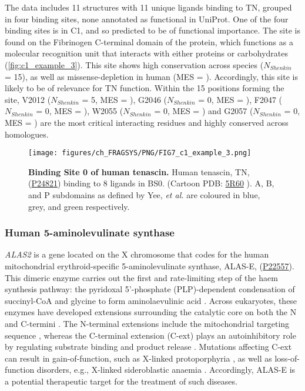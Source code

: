 The data includes 11 structures with 11 unique ligands binding to TN, grouped in four binding sites, none annotated as functional in UniProt. One of the four binding sites is in C1, and so predicted to be of functional importance. The site is found on the Fibrinogen C-terminal domain of the protein, which functions as a molecular recognition unit that interacts with either proteins or carbohydrates (\autoref{fig:c1_example_3}). This site shows high conservation across species ($N_{Shenkin}$ = 15), as well as missense-depletion in human (MES = ). Accordingly, this site is likely to be of relevance for TN function. Within the 15 positions forming the site, V2012 ($N_{Shenkin}$ = 5, MES = ), G2046 ($N_{Shenkin}$ = 0, MES = ), F2047 ($N_{Shenkin}$ = 0, MES = ), W2055 ($N_{Shenkin}$ = 0, MES = ) and G2057 ($N_{Shenkin}$ = 0, MES = ) are the most critical interacting residues and highly conserved across homologues.

\begin{figure}[htb!]
    \centering
    \texttt{[image: figures/ch\_FRAGSYS/PNG/FIG7\_c1\_example\_3.png]}
    \caption[Binding Site 0 of human tenascin]{\textbf{Binding Site 0 of human tenascin.} Human tenascin, TN, (\href{https://www.uniprot.org/uniprotkb/P24821/entry}{P24821}) binding to 8 ligands in BS0. (Cartoon PDB: \href{https://www.ebi.ac.uk/pdbe/entry/pdb/5r60}{5R60} \cite{PDB_5R60}). A, B, and P subdomains as defined by Yee, \textit{et al.} \cite{YEE_1997_FIBRINOGEN} are coloured in blue, grey, and green respectively.}
    \label{fig:c1_example_3}
\end{figure}

\subsubsection{Human 5-aminolevulinate synthase}

\textit{ALAS2} is a gene located on the X chromosome that codes for the human mitochondrial erythroid-specific 5-aminolevulinate synthase, ALAS-E, (\href{https://www.uniprot.org/uniprotkb/P22557/entry}{P22557}). This dimeric enzyme carries out the first and rate-limiting step of the haem synthesis pathway: the pyridoxal 5’-phosphate (PLP)-dependent condensation of succinyl-CoA and glycine to form aminolaevulinic acid \cite{AKHTAR_1976_PORPHYRIN}. Across eukaryotes, these enzymes have developed extensions surrounding the catalytic core on both the N and C-termini \cite{MUNAKATA_1993_AMINOLEVULINATE}. The N-terminal extensions include the mitochondrial targeting sequence \cite{SRIVASTAVA_1988_AMINOLEVULINATE}, whereas the C-terminal extension (C-ext) plays an autoinhibitory role by regulating substrate binding and product release \cite{BAILEY_2020_AMINOLEVULINATE}. Mutations affecting C-ext can result in gain-of-function, such as X-linked protoporphyria \cite{WHATLEY_2008_AMINOLEVULINATE}, as well as loss-of-function disorders, e.g., X-linked sideroblastic anaemia \cite{DUCAMP_2011_SIDEROBLASTIC}. Accordingly, ALAS-E is a potential therapeutic target for the treatment of such diseases.

